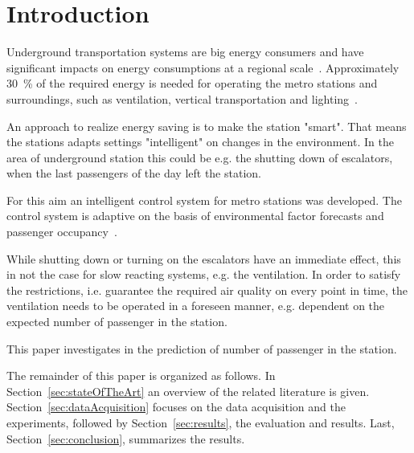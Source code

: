 \section{Introduction}
\label{sec:introduction}

Underground transportation systems are big energy consumers and have significant impacts on energy consumptions at a regional scale~\cite{anderson_maximizing_2009}. Approximately 30~\% of the required energy is needed for operating the metro stations and surroundings, such as ventilation, vertical transportation and lighting~\cite{TMB}.

An approach to realize energy saving is to make the station "smart". That means the stations adapts settings "intelligent" on changes in the environment. In the area of underground station this could be e.g. the shutting down of escalators, when the last passengers of the day left the station.

For this aim an intelligent control system for metro stations was developed. The control system is adaptive on the basis of environmental factor forecasts and passenger occupancy~\cite{guo_intelligent_2013}.

While shutting down or turning on the escalators have an immediate effect, this in not the case for slow reacting systems, e.g. the ventilation. In order to satisfy the restrictions, i.e. guarantee the required air quality on every point in time, the ventilation needs to be operated in a foreseen manner, e.g. dependent on the expected number of passenger in the station.

This paper investigates in the prediction of number of passenger in the station.

The remainder of this paper is organized as follows. In Section~\ref{sec:stateOfTheArt} an overview of the related literature is given. Section~\ref{sec:dataAcquisition} focuses on the data acquisition and the experiments, followed by Section~\ref{sec:results}, the evaluation and results. Last, Section~\ref{sec:conclusion}, summarizes the results.
